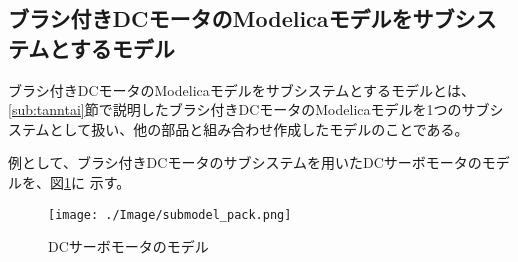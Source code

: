   
\clearpage
% 	



\subsection{ブラシ付きDCモータのModelicaモデルをサブシステムとするモデル} \label{sub:submodel}
ブラシ付きDCモータのModelicaモデルをサブシステムとするモデルとは、
\ref{sub:tanntai}節で説明したブラシ付きDCモータのModelicaモデルを1つのサブシステムとして扱い、他の部品と組み合わせ作成したモデルのことである。

例として、ブラシ付きDCモータのサブシステムを用いたDCサーボモータのモデルを、図\ref{fig:submodel}に
示す。

\begin{figure}[t]
	\centering
	\texttt{[image: ./Image/submodel\_pack.png]}
	\caption{DCサーボモータのモデル}
	\label{fig:submodel}
  \end{figure}

